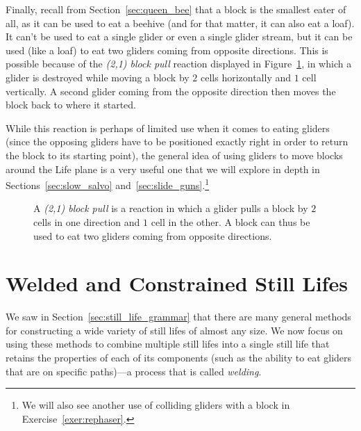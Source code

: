 Finally, recall from Section~\ref{sec:queen_bee} that a block is the smallest eater of all, as it can be used to eat a beehive (and for that matter, it can also eat a loaf). It can't be used to eat a single glider or even a single glider stream, but it can be used (like a loaf) to eat two gliders coming from opposite directions. This is possible because of the \emph{(2,1) block pull} reaction displayed in Figure~\ref{fig:glider_block_move}, in which a glider is destroyed while moving a block by $2$ cells horizontally and $1$ cell vertically. A second glider coming from the opposite direction then moves the block back to where it started.

While this reaction is perhaps of limited use when it comes to eating gliders (since the opposing gliders have to be positioned exactly right in order to return the block to its starting point), the general idea of using gliders to move blocks around the Life plane is a very useful one that we will explore in depth in Sections~\ref{sec:slow_salvo} and~\ref{sec:slide_guns}.\footnote{We will also see another use of colliding gliders with a block in Exercise~\ref{exer:rephaser}.}

\begin{figure}[!htb]
	\centering
	\caption{A \emph{(2,1) block pull} is a reaction in which a glider pulls a block by $2$ cells in one direction and $1$ cell in the other. A block can thus be used to eat two gliders coming from opposite directions.}\label{fig:glider_block_move}
\end{figure}


\section{Welded and Constrained Still Lifes}\label{sec:welding}

We saw in Section~\ref{sec:still_life_grammar} that there are many general methods for constructing a wide variety of still lifes of almost any size. We now focus on using these methods to combine multiple still lifes into a single still life that retains the properties of each of its components (such as the ability to eat gliders that are on specific paths)---a process that is called \emph{welding}.

